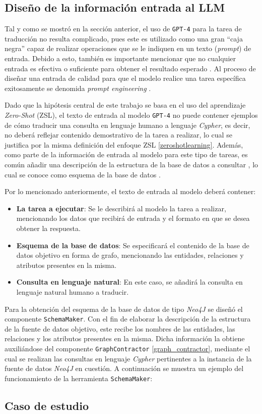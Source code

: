 \subsection{Diseño de la información entrada al LLM} \label{prompt_design}

Tal y como se mostró en la sección anterior, el uso de \texttt{GPT-4} para la tarea de traducción no resulta complicado, pues este es utilizado como una gran ``caja negra'' capaz de realizar operaciones que se le indiquen en un texto (\textit{prompt}) de entrada. Debido a esto, también es importante mencionar que no cualquier entrada es efectiva o suficiente para obtener el resultado esperado \cite{promtpengineeringeffectiveness}. Al proceso de diseñar una entrada de calidad para que el modelo realice una tarea específica exitosamente se denomida \textit{prompt engineering} \cite{promptengineering}. 

Dado que la hipótesis central de este trabajo se basa en el uso del aprendizaje \textit{Zero-Shot} (ZSL), el texto de entrada al modelo \texttt{GPT-4} no puede contener ejemplos de cómo traducir una consulta en lenguaje humano a lenguaje \textit{Cypher}, es decir, no deberá reflejar contenido demostrativo de la tarea a realizar, lo cual se justifica por la misma definición del enfoque ZSL \ref{zeroshotlearning}. Además, como parte de la información de entrada al modelo para este tipo de tareas, es común añadir una descripción de la estructura de la base de datos a consultar \cite{samplepromptsnl2ql1} \cite{samplepromptsnl2ql2}, lo cual se conoce como esquema de la base de datos \cite{dbschema}. 

Por lo mencionado anteriormente, el texto de entrada al modelo deberá contener:

\begin{itemize}
	\item \textbf{La tarea a ejecutar}: Se le describirá al modelo la tarea a realizar, mencionando los datos que recibirá de entrada y el formato en que se desea obtener la respuesta.
	\item \textbf{Esquema de la base de datos}: Se especificará el contenido de la base de datos objetivo en forma de grafo, mencionando las entidades, relaciones y atributos presentes en la misma.
	\item \textbf{Consulta en lenguaje natural}: En este caso, se añadirá la consulta en lenguaje natural humano a traducir.
\end{itemize}

Para la obtención del esquema de la base de datos de tipo \textit{Neo4J} se diseñó el componente \texttt{SchemaMaker}. Con el fin de elaborar la descripción de la estructura de la fuente de datos objetivo, este recibe los nombres de las entidades, las relaciones y los atributos presentes en la misma. Dicha información la obtiene auxiliándose del componente \texttt{GraphContractor} \ref{graph_contractor}, mediante el cual se realizan las consultas en lenguaje \textit{Cypher} pertinentes a la instancia de la fuente de datos \textit{Neo4J} en cuestión. A continuación se muestra un ejemplo del funcionamiento de la herramienta \texttt{SchemaMaker}:

\subsection{Caso de estudio} \label{sample_case}